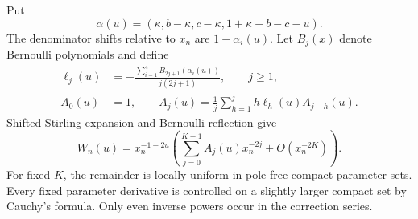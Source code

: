\documentclass[11pt,a4paper]{article}
\numberwithin{equation}{section}
\theoremstyle{definition}\newtheorem{definition}[theorem]{Definition}
\theoremstyle{remark}\newtheorem{remark}[theorem]{Remark}
\begin{document}
Put
\begin{equation}
 \alpha(u)=(\kappa,b-\kappa,c-\kappa,1+\kappa-b-c-u).
 \label{eq:alpha}
\end{equation}
The denominator shifts relative to $x_n$ are $1-\alpha_i(u)$.
Let $B_j(x)$ denote Bernoulli polynomials and define
\begin{align}
 \ell_j(u)&=-\frac{\sum_{i=1}^4B_{2j+1}(\alpha_i(u))}{j(2j+1)},
 \qquad j\ge1,\label{eq:ell}\\
 A_0(u)&=1,\qquad
 A_j(u)=\frac1j\sum_{h=1}^j h\ell_h(u)A_{j-h}(u).\label{eq:A}
\end{align}
Shifted Stirling expansion and Bernoulli reflection give
\begin{equation}
 W_n(u)=x_n^{-1-2u}
 \left(\sum_{j=0}^{K-1}A_j(u)x_n^{-2j}+O(x_n^{-2K})\right).
 \label{eq:centered-expansion}
\end{equation}
For fixed $K$, the remainder is locally uniform in pole-free compact
parameter sets. Every fixed parameter derivative is controlled on a
slightly larger compact set by Cauchy's formula. Only even inverse powers
occur in the correction series.
\end{document}
